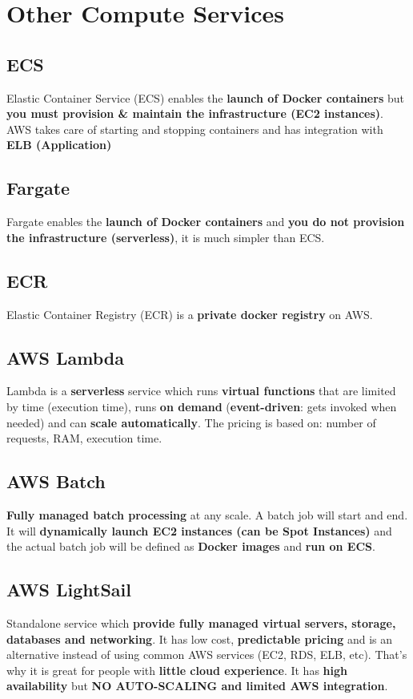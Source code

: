 \section{Other Compute Services}

\subsection{ECS}
Elastic Container Service (ECS) enables the \textbf{launch of Docker containers} but \textbf{you must provision \& maintain the infrastructure (EC2 instances)}.
AWS takes care of starting and stopping containers and has integration with \textbf{ELB (Application)}

\subsection{Fargate}
Fargate enables the \textbf{launch of Docker containers} and \textbf{you do not provision the infrastructure (serverless)}, it is much simpler than ECS.

\subsection{ECR}
Elastic Container Registry (ECR) is a \textbf{private docker registry} on AWS.

\subsection{AWS Lambda}
Lambda is a \textbf{serverless} service which runs \textbf{virtual functions} that are limited by time (execution time), runs \textbf{on demand} (\textbf{event-driven}: gets invoked when needed) and can \textbf{scale automatically}.
The pricing is based on: number of requests, RAM, execution time.

\subsection{AWS Batch}
\textbf{Fully managed batch processing} at any scale. A batch job will start and end.
It will \textbf{dynamically launch EC2 instances (can be Spot Instances)} and the actual batch job will be defined as \textbf{Docker images} and \textbf{run on ECS}.

\subsection{AWS LightSail}
Standalone service which \textbf{provide fully managed virtual servers, storage, databases and networking}.
It has low cost, \textbf{predictable pricing} and is an alternative instead of using common AWS services (EC2, RDS, ELB, etc). That's why it is great for people with \textbf{little cloud experience}.
It has \textbf{high availability} but \textbf{NO AUTO-SCALING and limited AWS integration}.